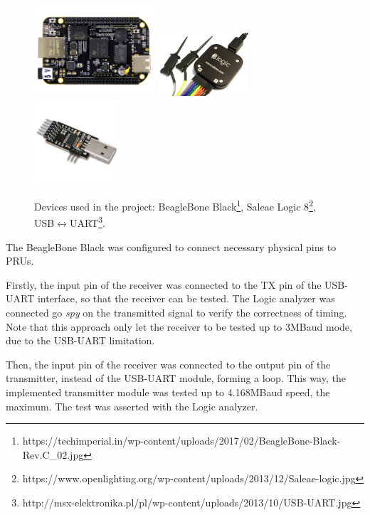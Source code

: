\documentclass[a4,11pt]{article}
\begin{document}
\begin{figure}
    \begin{minipage}{\linewidth}
        \label{devices}

        \includegraphics[width=0.4\textwidth]{img/bbb.jpg}
        \includegraphics[width=0.3\textwidth]{img/saleae.jpg}
        \includegraphics[width=0.28\textwidth]{img/usb.jpg}
        \caption[Devices used in the project]{Devices used in the project: BeagleBone Black\footnote{https://techimperial.in/wp-content/uploads/2017/02/BeagleBone-Black-Rev.C\_02.jpg},
        Saleae Logic 8\footnote{https://www.openlighting.org/wp-content/uploads/2013/12/Saleae-logic.jpg},
        USB$\leftrightarrow$UART\footnote{http://msx-elektronika.pl/pl/wp-content/uploads/2013/10/USB-UART.jpg}.}
    \end{minipage}
\end{figure}


The BeagleBone Black was configured to connect necessary physical pins to PRUs.

Firstly, the input pin of the receiver was connected to the TX pin of the USB-UART interface, so that the receiver can be tested. The Logic analyzer was connected go \textit{spy} on the transmitted signal to verify the correctness of timing. Note that this approach only let the receiver to be tested up to 3MBaud mode, due to the USB-UART limitation.

Then, the input pin of the receiver was connected to the output pin of the transmitter, instead of the USB-UART module, forming a loop. This way, the implemented transmitter module was tested up to 4.168MBaud speed, the maximum. The test was asserted with the Logic analyzer.
\end{document}
